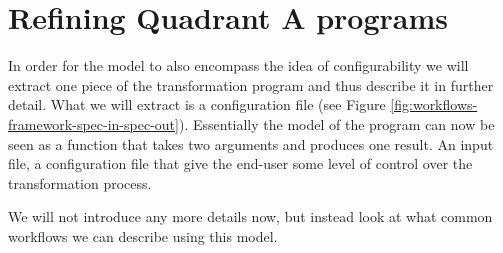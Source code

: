 \documentclass{scrreprt}
\begin{document}













\section{Refining Quadrant A programs}
In order for the model to also encompass the idea of configurability we will extract one piece of the transformation program and thus describe it in further detail. What we will extract is a configuration file (see Figure \ref{fig:workflows-framework-spec-in-spec-out}). Essentially the model of the program can now be seen as a function that takes two arguments and produces one result. An input file, a configuration file that give the end-user some level of control over the transformation process.

We will not introduce any more details now, but instead look at what common workflows we can describe using this model.
\end{document}
